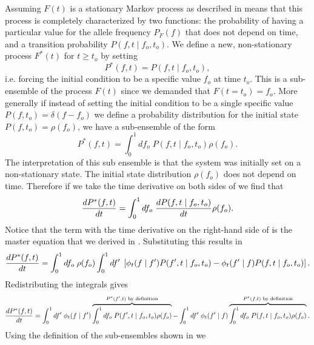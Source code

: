 Assuming $F(t)$ is a stationary Markov process as described in
 means that this process is completely
characterized by two functions: the probability of having a particular value for
the allele frequency $P_F(f)$ that does not depend on time, and a transition
probability $P(f, t \mid f_o, t_o)$. We define a new, non-stationary process
$F^*(t)$ for $t \geq t_o$ by setting
\begin{equation}
  P^*(f, t) = P(f, t\mid f_o, t_o),
\end{equation}
i.e. forcing the initial condition to be a specific value $f_o$ at time $t_o$.
This is a sub-ensemble of the process $F(t)$ since we demanded that $F(t = t_o)
= f_o$. More generally if instead of setting the initial condition to be a
single specific value $P(f, t_o) = \delta(f - f_o)$ we define a probability
distribution for the initial state $P(f, t_o) = \rho(f_o)$, we have a
sub-ensemble of the form
\begin{equation}
  P^*(f, t) = \int_0^1 df_o \; P(f, t\mid f_o, t_o) \rho(f_o).
  \label{eq_subensemble}
\end{equation}
The interpretation of this sub ensemble is that the system was initially set on
a non-stationary state. The initial state distribution $\rho(f_o)$ does not
depend on time. Therefore if we take the time derivative on both sides of
 we find that
\begin{equation}
  {d{P^*(f, t)} \over dt} = \int_0^1 df_o \; {d{P(f, t\mid f_o, t_o)} \over dt}
                        \rho(f_o).
\label{eq_subensemble_dt}
\end{equation}
Notice that the term with the time derivative on the right-hand side of
 is the master equation that we derived in
. Substituting this results in
\begin{equation}
  {d{P^*(f, t)} \over dt} = \int_0^1 df_o \; \rho(f_o)
  \int_0^1 df' \;
  \left[ \phi_t(f \mid f') P(f', t \mid f_o, t_o) -
  \phi_t(f' \mid f) P(f, t \mid f_o, t_o) \right].
\end{equation}
Redistributing the integrals gives
\begin{equation}
  {d{P^*(f, t)} \over dt} = \int_0^1 df' \; \phi_t(f \mid f')
  \overbrace{
  \int_0^1 df_o \; P(f', t \mid f_o, t_o) \rho(f_o)}
  ^{P^*(f', t)\text{ by definition}} -
  \int_0^1 df' \; \phi_t(f' \mid f)
  \overbrace{
  \int_0^1 df_o \; P(f, t \mid f_o, t_o) \rho(f_o)}
  ^{P^*(f, t)\text{ by definition}}.
\end{equation}
Using the definition of the sub-ensembles shown in  we
